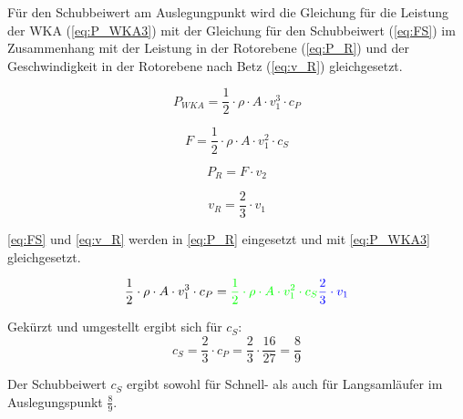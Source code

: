 Für den Schubbeiwert am Auslegungpunkt wird die Gleichung für die Leistung der WKA (\autoref{eq:P_WKA3}) mit der Gleichung für den Schubbeiwert (\autoref{eq:FS}) im Zusammenhang mit der Leistung in der Rotorebene (\autoref{eq:P_R})  und der Geschwindigkeit in der Rotorebene nach Betz (\autoref{eq:v_R}) gleichgesetzt. 

\begin{equation}
P_{WKA}= \frac{1}{2} \cdot \rho \cdot A \cdot v_1^3  \cdot c_P
\label{eq:P_WKA3} 
\end{equation}

\color{green}{}
\begin{equation}
F= \frac{1}{2} \cdot \rho \cdot A \cdot v_1^2  \cdot c_S
\label{eq:FS} 
\end{equation}
\color{black}{}


\begin{equation}
P_R= F \cdot v_2 
\label{eq:P_R} 
\end{equation}

\color{blue}{}
\begin{equation}
v_R= \frac{2}{3} \cdot v_1
\label{eq:v_R} 
\end{equation}
\color{black}{}


\autoref{eq:FS} und \autoref{eq:v_R} werden in \autoref{eq:P_R} eingesetzt und mit \autoref{eq:P_WKA3} gleichgesetzt. 

\begin{equation}
\frac{1}{2} \cdot \rho \cdot A \cdot v_1^3 \cdot c_P = \color{green}{}\frac{1}{2} \cdot \rho \cdot A \cdot v_1^2  \cdot c_S \color{blue}{}\frac{2}{3} \cdot v_1 \color{black}{}
\label{eq:c_s1} 
\end{equation}

Gekürzt und umgestellt ergibt sich für $c_S$:
\begin{equation}
c_S= \frac{2}{3} \cdot c_P = \frac{2}{3} \cdot \frac{16}{27} = \frac{8}{9}
\label{eq:c_S} 
\end{equation}

Der Schubbeiwert $c_S$ ergibt sowohl für Schnell- als auch für Langsamläufer im Auslegungspunkt $\frac{8}{9}$.

\label{sec:Vorbereitungsfragen}
